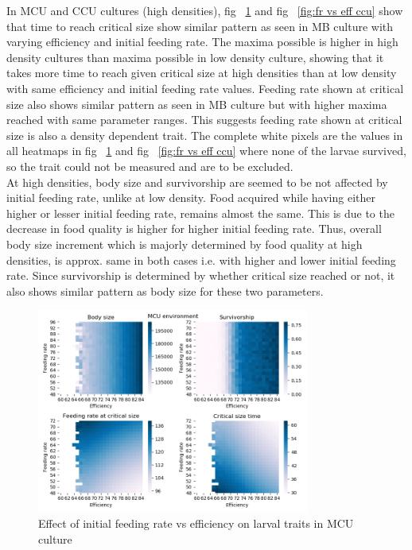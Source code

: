 In MCU and CCU cultures (high densities), fig ~\ref{fig:fr vs eff mcu} and fig ~\ref{fig:fr vs eff ccu} show that time to reach critical size show similar pattern as seen in MB culture with varying efficiency and initial feeding rate. The maxima possible is higher in high density cultures than maxima possible in low density culture, showing that it takes more time to reach given critical size at high densities than at low density with same efficiency and initial feeding rate values. Feeding rate shown at critical size also shows similar pattern as seen in MB culture but with higher maxima reached with same parameter ranges. This suggests feeding rate shown at critical size is also a density dependent trait.
The complete white pixels are the values in all heatmaps in fig ~\ref{fig:fr vs eff mcu} and fig ~\ref{fig:fr vs eff ccu} where none of the larvae survived, so the trait could not be measured and are to be excluded.
\\
At high densities, body size and survivorship are seemed to be not affected by initial feeding rate, unlike at low density. Food acquired while having either higher or lesser initial feeding rate, remains almost the same. This is due to the decrease in food quality is higher for higher initial feeding rate. Thus, overall body size increment which is majorly determined by food quality at high densities, is approx. same in both cases i.e. with higher and lower initial feeding rate. Since survivorship is determined by whether critical size reached or not, it also shows similar pattern as body size for these two parameters.
\begin{figure}[h]
  \centering
  \includegraphics[width=0.8\textwidth]{C3/Figs/Feeding rate_vs_Efficiency_MCU}
  \caption{Effect of initial feeding rate vs efficiency on larval traits in MCU culture}
  \label{fig:fr vs eff mcu}
\end{figure}\\
